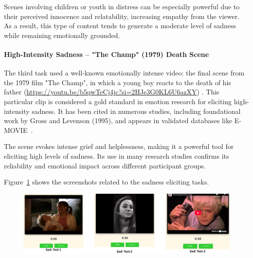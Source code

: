 Scenes involving children or youth in distress can be especially powerful due to their perceived innocence and relatability, increasing empathy from the viewer. As a result, this type of content tends to generate a moderate level of sadness while remaining emotionally grounded.

\paragraph*{High-Intensity Sadness – "The Champ" (1979) Death Scene}

The third task used a well-known emotionally intense video: the final scene from the 1979 film "The Champ", in which a young boy reacts to the death of his father (\url{https://youtu.be/b5qwTeCj4jc?si=2HJe3G0KL6U6azXY}) \citep{luiza_lootens_champ_final}. This particular clip is considered a gold standard in emotion research for eliciting high-intensity sadness. It has been cited in numerous studies, including foundational work by Gross and Levenson (1995), and appears in validated databases like E-MOVIE~\citep{kuijsters2016inducing, maffei2019movie}.

The scene evokes intense grief and helplessness, making it a powerful tool for eliciting high levels of sadness. Its use in many research studies confirms its reliability and emotional impact across different participant groups.

Figure~\ref{fig:task-sad} shows the screenshots related to the sadness eliciting tasks.

\begin{figure}[h]
    \centering
    \includegraphics[width=1\textwidth]{img/chapter_03/sad_tests.png}
    \label{fig:task-sad}
\end{figure}